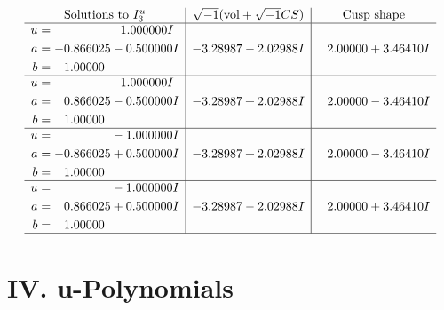 \documentclass[1p]{elsarticle_modified}
\theoremstyle{definition}
\newcommand{\I}{\sqrt{-1}}
\begin{document}
$$\begin{array}{c|c|c}  
\text{Solutions to }I^u_{3}& \I (\text{vol} + \sqrt{-1}CS) & \text{Cusp shape}\\
 \hline 
\begin{aligned}
u &= \phantom{-0.000000 -}1.000000 I \\
a &= -0.866025 - 0.500000 I \\
b &= \phantom{-}1.00000\phantom{ +0.000000I}\end{aligned}
 & -3.28987 - 2.02988 I & \phantom{-}2.00000 + 3.46410 I \\ \hline\begin{aligned}
u &= \phantom{-0.000000 -}1.000000 I \\
a &= \phantom{-}0.866025 - 0.500000 I \\
b &= \phantom{-}1.00000\phantom{ +0.000000I}\end{aligned}
 & -3.28987 + 2.02988 I & \phantom{-}2.00000 - 3.46410 I \\ \hline\begin{aligned}
u &= \phantom{-0.000000 } -1.000000 I \\
a &= -0.866025 + 0.500000 I \\
b &= \phantom{-}1.00000\phantom{ +0.000000I}\end{aligned}
 & -3.28987 + 2.02988 I & \phantom{-}2.00000 - 3.46410 I \\ \hline\begin{aligned}
u &= \phantom{-0.000000 } -1.000000 I \\
a &= \phantom{-}0.866025 + 0.500000 I \\
b &= \phantom{-}1.00000\phantom{ +0.000000I}\end{aligned}
 & -3.28987 - 2.02988 I & \phantom{-}2.00000 + 3.46410 I\\
 \hline 
 \end{array}$$\newpage
\newpage\renewcommand{\arraystretch}{1}
\centering \section*{ IV. u-Polynomials}
\end{document}
